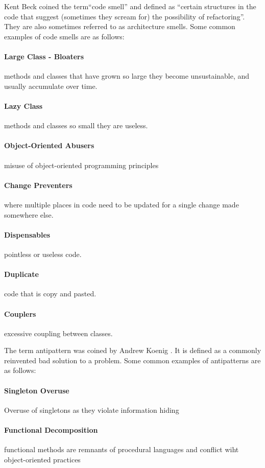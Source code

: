\documentclass[conference]{IEEEtran}
\begin{document}
Kent Beck coined the term``code smell'' \cite{fowler_refactoring:_2018} and defined as ``certain structures in the code that suggest (sometimes they scream for) the possibility of refactoring''. They are also sometimes referred to as architecture smells.
Some common examples of code smells are as follows:
\paragraph{Large Class - Bloaters} methods and classes that have grown so large they become unsustainable, and usually accumulate over time.
\paragraph{Lazy Class} methods and classes so small they are useless.
\paragraph{Object-Oriented Abusers} misuse of object-oriented programming principles
\paragraph{Change Preventers} where multiple places in code need to be updated for a single change made somewhere else.
\paragraph{Dispensables} pointless or useless code.
\paragraph{Duplicate} code that is copy and pasted.
\paragraph{Couplers} excessive coupling between classes.

The term antipattern was coined by Andrew Koenig \cite{koenig_patterns_1998}. 
It is defined as a commonly reinvented bad solution to a problem.
Some common examples of antipatterns are as follows:
\paragraph{Singleton Overuse} Overuse of singletons as they violate information hiding
\paragraph{Functional Decomposition} functional methods are remnants of procedural languages and conflict wiht object-oriented practices
\end{document}
